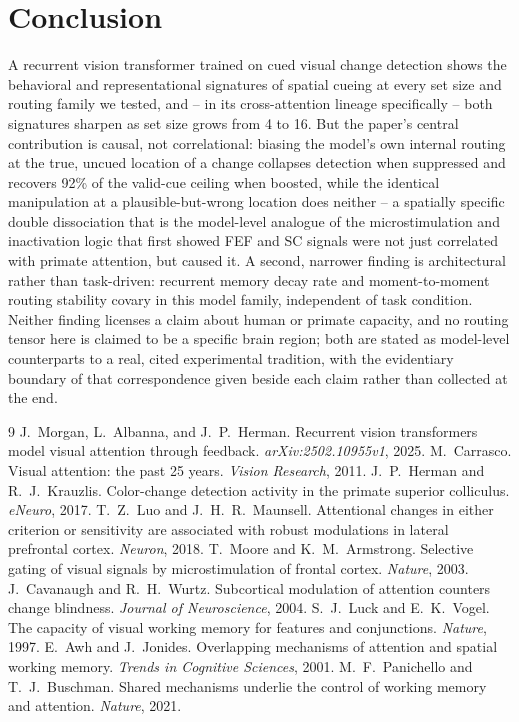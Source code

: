 \documentclass[10pt]{article}
\begin{document}
\FloatBarrier
\section{Conclusion}
A recurrent vision transformer trained on cued visual change detection shows the behavioral and representational signatures of spatial cueing at every set size and routing family we tested, and -- in its cross-attention lineage specifically -- both signatures sharpen as set size grows from 4 to 16. But the paper's central contribution is causal, not correlational: biasing the model's own internal routing at the true, uncued location of a change collapses detection when suppressed and recovers 92\% of the valid-cue ceiling when boosted, while the identical manipulation at a plausible-but-wrong location does neither -- a spatially specific double dissociation that is the model-level analogue of the microstimulation and inactivation logic that first showed FEF and SC signals were not just correlated with primate attention, but caused it. A second, narrower finding is architectural rather than task-driven: recurrent memory decay rate and moment-to-moment routing stability covary in this model family, independent of task condition. Neither finding licenses a claim about human or primate capacity, and no routing tensor here is claimed to be a specific brain region; both are stated as model-level counterparts to a real, cited experimental tradition, with the evidentiary boundary of that correspondence given beside each claim rather than collected at the end.


\begin{thebibliography}{9}
\small
{} J.~Morgan, L.~Albanna, and J.~P.~Herman. Recurrent vision transformers model visual attention through feedback. \emph{arXiv:2502.10955v1}, 2025.
 M.~Carrasco. Visual attention: the past 25 years. \emph{Vision Research}, 2011.
 J.~P.~Herman and R.~J.~Krauzlis. Color-change detection activity in the primate superior colliculus. \emph{eNeuro}, 2017.
 T.~Z.~Luo and J.~H.~R.~Maunsell. Attentional changes in either criterion or sensitivity are associated with robust modulations in lateral prefrontal cortex. \emph{Neuron}, 2018.
 T.~Moore and K.~M.~Armstrong. Selective gating of visual signals by microstimulation of frontal cortex. \emph{Nature}, 2003.
 J.~Cavanaugh and R.~H.~Wurtz. Subcortical modulation of attention counters change blindness. \emph{Journal of Neuroscience}, 2004.
 S.~J.~Luck and E.~K.~Vogel. The capacity of visual working memory for features and conjunctions. \emph{Nature}, 1997.
 E.~Awh and J.~Jonides. Overlapping mechanisms of attention and spatial working memory. \emph{Trends in Cognitive Sciences}, 2001.
 M.~F.~Panichello and T.~J.~Buschman. Shared mechanisms underlie the control of working memory and attention. \emph{Nature}, 2021.
\end{thebibliography}
\end{document}
